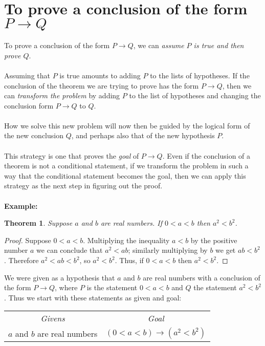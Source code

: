 \documentclass{report}
\newtheorem*{theorem}{Theorem}
\begin{document}
\section{To prove a conclusion of the form $P\to Q$}
To prove a conclusion of the form $P\to Q$, we can \textit{assume $P$ is true and then prove $Q$}.\\
\vspace{1mm}\\
Assuming that $P$ is true amounts to adding $P$ to the lists of hypotheses. If the conclusion of the theorem we are trying to prove has the form $P\to Q$, then we can \textit{transform the
problem} by adding $P$ to the list of hypotheses and changing the conclusion form $P\to Q$ to $Q$.\\
\vspace{1mm}\\
How we solve this new problem will now then be guided by the logical form of the new conclusion $Q$, and perhaps also that of the new hypothesis $P$.\\
\vspace{1mm}\\
This strategy is one that proves the \textit{goal} of $P\to Q$. Even if the conclusion of a theorem is not a conditional statement, if we transform the problem in such a way that the conditional
statement becomes the goal, then we can apply this strategy as the next step in figuring out the proof.\\
\vspace{1mm}\\
\textbf{Example:}
\begin{theorem}
Suppose $a$ and $b$ are real numbers. If $0<a<b$ then $a^2<b^2$.
\end{theorem}
\begin{proof}
Suppose $0<a<b$. Multiplying the inequality $a<b$ by the positive number $a$ we can conclude that $a^2<ab$; similarly multiplying by $b$ we get $ab<b^2$. Therefore $a^2<ab<b^2$, so $a^2<b^2$. Thus, if $0<a<b$ then $a^2<b^2$.
\end{proof}
\noindent We were given as a hypothesis that $a$ and $b$ are real numbers with a conclusion of the form $P\to Q$, where $P$ is the statement $0<a<b$ and $Q$ the statement $a^2<b^2$. Thus
we start with these statements as given and goal:
\begin{center}
\begin{tabular}{c|c}
\textit{Givens}&\textit{Goal}\\
$a$ and $b$ are real numbers&$(0<a<b)\to(a^2<b^2)$
\end{tabular}
\end{center}
\end{document}
